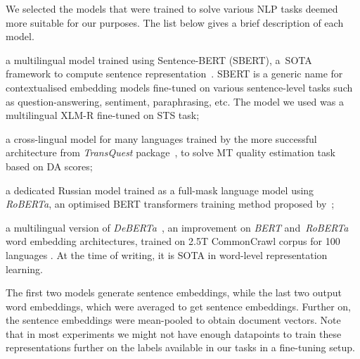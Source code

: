 We selected the models that were trained to solve various NLP tasks deemed more suitable for our purposes. The list below gives a brief description of each model. 
\label{pg:embeddings}
\begin{description}\compresslist{}
	\item[stsb-xlm-r-m:] a multilingual model trained using Sentence-BERT (SBERT), a~\gls{SOTA} framework to compute sentence representation~\cite{Reimers2019}. SBERT is a generic name for contextualised embedding models fine-tuned on various sentence-level tasks such as question-answering, sentiment, paraphrasing, etc. The model we used was a multilingual XLM-R fine-tuned on \gls{STS} task;
	
	\item[TQmono-m:] a cross-lingual model for many languages trained by the more successful architecture from \textit{TransQuest} package~\cite{Ranasinghe2020}, to solve MT quality estimation task based on DA scores;
	
	\item[ruRoberta:] a dedicated Russian model trained as a full-mask language model using \textit{RoBERTa}, an optimised BERT transformers training method proposed by~\cite{Liu2019};
	
	\item[mdeberta3:] a multilingual version of \textit{DeBERTa}~\cite{He2021}, an improvement on \textit{BERT} and~\textit{RoBERTa} word embedding architectures, trained on 2.5T CommonCrawl corpus for 100 languages . At the time of writing, it is \gls{SOTA} in word-level representation learning. 
\end{description}

The first two models generate sentence embeddings, while the last two output word embeddings, which were averaged to get sentence embeddings. Further on, the sentence embeddings were mean-pooled to obtain document vectors. 
Note that in most experiments we might not have enough datapoints to train these representations further on the labels available in our tasks in a fine-tuning setup. %

